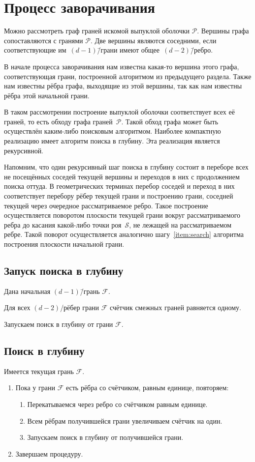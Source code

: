 \documentclass[a4paper,12pt]{article}
\newcommand{\Swarm}{\mathcal{S}}              %
\newcommand{\Polyhedron}{\mathcal{P}}         %
\newcommand{\Facet}{\mathcal{F}}              %
\renewcommand{\.}{\hspace{0.2ex}}
\begin{document}
\section{Процесс заворачивания}
  Можно рассмотреть граф граней искомой выпуклой оболочки $\Polyhedron$. Вершины графа сопоставляются с гранями $\Polyhedron$. Две вершины являются соседними, если соответствующие им~$(d-1)$\=/грани имеют общее~$(d-2)$\=/ребро.

  В начале процесса заворачивания нам известна какая-то вершина этого графа, соответствующая грани, построенной алгоритмом из предыдущего раздела. Также нам известны рёбра графа, выходящие из этой вершины, так как нам известны рёбра этой начальной грани.

  В таком рассмотрении построение выпуклой оболочки соответствует всех её граней, то есть обходу графа граней~$\Polyhedron$. Такой обход графа может быть осуществлён каким-либо поисковым алгоритмом. Наиболее компактную реализацию имеет алгоритм поиска в глубину. Эта реализация является рекурсивной.

  Напомним, что один рекурсивный шаг поиска в глубину состоит в переборе всех не посещённых соседей текущей вершины и переходов в них с продолжением поиска оттуда. В геометрических терминах перебор соседей и переход в них соответствует перебору рёбер текущей грани и построению грани, соседней текущей через очередное рассматриваемое ребро. Такое построение осуществляется поворотом плоскости текущей грани вокруг рассматриваемого ребра до касания какой-либо точки роя~$\Swarm$, не лежащей на рассматриваемом ребре. Такой поворот осуществляется аналогично шагу~\ref{item:search} алгоритма построения плоскости начальной грани.

  \subsection{Запуск поиска в глубину}
    Дана начальная $(d-1)$\=/грань $\Facet$.

    Для всех $(d-2)$\-/рёбер грани $\Facet$ счётчик смежных граней равняется одному.

    Запускаем поиск в глубину от грани $\Facet$.

  \subsection{Поиск в глубину}

    Имеется текущая грань $\Facet$.
    \begin{enumerate}
      \item Пока у грани $\Facet$ есть рёбра со счётчиком, равным единице, повторяем:
      \begin{enumerate}
        \item Перекатываемся через ребро со счётчиком равным единице.
        \item Всем рёбрам получившейся грани увеличиваем счётчик на один.
        \item Запускаем поиск в глубину от получившейся грани.
      \end{enumerate}
      \item Завершаем процедуру.
    \end{enumerate}
\end{document}
